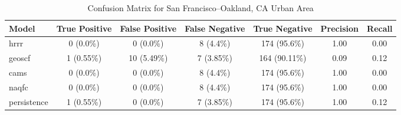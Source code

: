 \begin{table}[h!]
\centering
\begin{tabular}{lcccccc}
\hline
Model & True Positive & False Positive & False Negative & True Negative & Precision & Recall\\ \hline
hrrr & 0 (0.0\%) & 0 (0.0\%) & 8 (4.4\%) & 174 (95.6\%) & \cellcolor{green!25}1.00 & \cellcolor{red!25}0.00 \\ 
geoscf & 1 (0.55\%) & 10 (5.49\%) & 7 (3.85\%) & 164 (90.11\%) & \cellcolor{red!25}0.09 & \cellcolor{green!25}0.12 \\ 
cams & 0 (0.0\%) & 0 (0.0\%) & 8 (4.4\%) & 174 (95.6\%) & \cellcolor{green!25}1.00 & \cellcolor{red!25}0.00 \\ 
naqfc & 0 (0.0\%) & 0 (0.0\%) & 8 (4.4\%) & 174 (95.6\%) & \cellcolor{green!25}1.00 & \cellcolor{red!25}0.00 \\ 
persistence & 1 (0.55\%) & 0 (0.0\%) & 7 (3.85\%) & 174 (95.6\%) & 1.00 & 0.12 \\ 
\hline
\end{tabular}
\caption{Confusion Matrix for San Francisco--Oakland, CA Urban Area}
\end{table}
